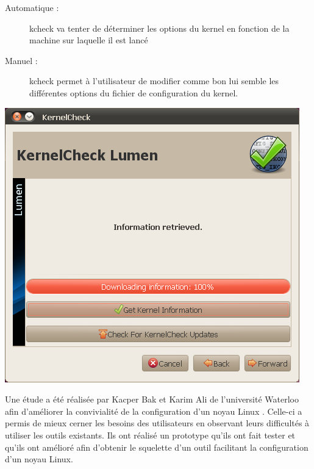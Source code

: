 \documentclass[16pts]{report}
\begin{document}
\begin{description}
    \begin{description}
        \item[Automatique :] kcheck va tenter de déterminer les options du kernel
            en fonction de la machine sur laquelle il est lancé
        \item[Manuel :] kcheck permet à l’utilisateur de modifier comme bon lui
            semble les différentes options du fichier de configuration du kernel.
    \end{description}
        \includegraphics[scale=0.8]{illustrations/KernelCheck.png}\\
\end{description}

Une étude a été réalisée par Kacper Bak et Karim Ali de l’université Waterloo
    afin d’améliorer la convivialité de la configuration d’un noyau Linux
    \cite{Waterloo:Etude}.
Celle-ci a permis de mieux cerner les besoins des utilisateurs en observant
    leurs difficultés à utiliser les outils existants. Ils ont réalisé
    un prototype qu’ils ont fait tester et qu’ils ont amélioré afin d’obtenir
    le squelette d’un outil facilitant la configuration d’un noyau Linux. \\
\end{document}
